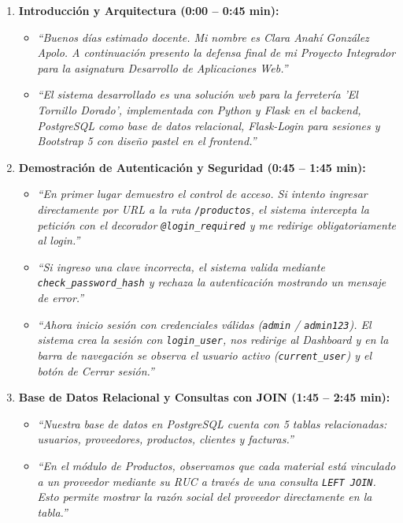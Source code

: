 \documentclass[11pt,a4paper]{article}
\begin{document}
\begin{enumerate}[leftmargin=1.2cm]
    \item \textbf{Introducción y Arquitectura (0:00 -- 0:45 min):}
    \begin{itemize}
        \item \textit{``Buenos días estimado docente. Mi nombre es Clara Anahí González Apolo. A continuación presento la defensa final de mi Proyecto Integrador para la asignatura Desarrollo de Aplicaciones Web.''}
        \item \textit{``El sistema desarrollado es una solución web para la ferretería 'El Tornillo Dorado', implementada con Python y Flask en el backend, PostgreSQL como base de datos relacional, Flask-Login para sesiones y Bootstrap 5 con diseño pastel en el frontend.''}
    \end{itemize}

    \item \textbf{Demostración de Autenticación y Seguridad (0:45 -- 1:45 min):}
    \begin{itemize}
        \item \textit{``En primer lugar demuestro el control de acceso. Si intento ingresar directamente por URL a la ruta \texttt{/productos}, el sistema intercepta la petición con el decorador \texttt{@login\_required} y me redirige obligatoriamente al login.''}
        \item \textit{``Si ingreso una clave incorrecta, el sistema valida mediante \texttt{check\_password\_hash} y rechaza la autenticación mostrando un mensaje de error.''}
        \item \textit{``Ahora inicio sesión con credenciales válidas (\texttt{admin} / \texttt{admin123}). El sistema crea la sesión con \texttt{login\_user}, nos redirige al Dashboard y en la barra de navegación se observa el usuario activo (\texttt{current\_user}) y el botón de Cerrar sesión.''}
    \end{itemize}

    \item \textbf{Base de Datos Relacional y Consultas con JOIN (1:45 -- 2:45 min):}
    \begin{itemize}
        \item \textit{``Nuestra base de datos en PostgreSQL cuenta con 5 tablas relacionadas: usuarios, proveedores, productos, clientes y facturas.''}
        \item \textit{``En el módulo de Productos, observamos que cada material está vinculado a un proveedor mediante su RUC a través de una consulta \texttt{LEFT JOIN}. Esto permite mostrar la razón social del proveedor directamente en la tabla.''}
    \end{itemize}


\end{enumerate}
\end{document}

